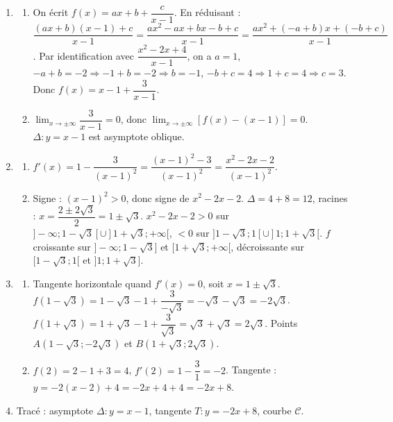 \begin{enumerate}[label=\arabic*)]
\item 
\begin{enumerate}[label=\alph*)]
\item On écrit $f(x)=ax+b+\dfrac{c}{x-1}$. En réduisant : $\dfrac{(ax+b)(x-1)+c}{x-1}=\dfrac{ax^2-ax+bx-b+c}{x-1}=\dfrac{ax^2+(-a+b)x+(-b+c)}{x-1}$. Par identification avec $\dfrac{x^2-2x+4}{x-1}$, on a $a=1$, $-a+b=-2 \Rightarrow -1+b=-2 \Rightarrow b=-1$, $-b+c=4 \Rightarrow 1+c=4 \Rightarrow c=3$. Donc $f(x)=x-1+\dfrac{3}{x-1}$.
\item $\lim_{x\to\pm\infty}\dfrac{3}{x-1}=0$, donc $\lim_{x\to\pm\infty}[f(x)-(x-1)]=0$. $\Delta:y=x-1$ est asymptote oblique.
\end{enumerate}
\item 
\begin{enumerate}[label=\alph*)]
\item $f'(x)=1-\dfrac{3}{(x-1)^2}=\dfrac{(x-1)^2-3}{(x-1)^2}=\dfrac{x^2-2x-2}{(x-1)^2}$.
\item Signe : $(x-1)^2>0$, donc signe de $x^2-2x-2$. $\Delta=4+8=12$, racines : $x=\dfrac{2\pm2\sqrt3}{2}=1\pm\sqrt3$. $x^2-2x-2>0$ sur $]-\infty;1-\sqrt3[\cup]1+\sqrt3;+\infty[$, $<0$ sur $]1-\sqrt3;1[\cup]1;1+\sqrt3[$. $f$ croissante sur $]-\infty;1-\sqrt3]$ et $[1+\sqrt3;+\infty[$, décroissante sur $[1-\sqrt3;1[$ et $]1;1+\sqrt3]$.
\end{enumerate}
\item 
\begin{enumerate}[label=\alph*)]
\item Tangente horizontale quand $f'(x)=0$, soit $x=1\pm\sqrt3$. $f(1-\sqrt3)=1-\sqrt3-1+\dfrac{3}{-\sqrt3}=-\sqrt3-\sqrt3=-2\sqrt3$. $f(1+\sqrt3)=1+\sqrt3-1+\dfrac{3}{\sqrt3}=\sqrt3+\sqrt3=2\sqrt3$. Points $A(1-\sqrt3;-2\sqrt3)$ et $B(1+\sqrt3;2\sqrt3)$.
\item $f(2)=2-1+3=4$, $f'(2)=1-\dfrac{3}{1}= -2$. Tangente : $y=-2(x-2)+4=-2x+4+4=-2x+8$.
\end{enumerate}
\item Tracé : asymptote $\Delta:y=x-1$, tangente $T:y=-2x+8$, courbe $\mathcal{C}$.
\end{enumerate}

